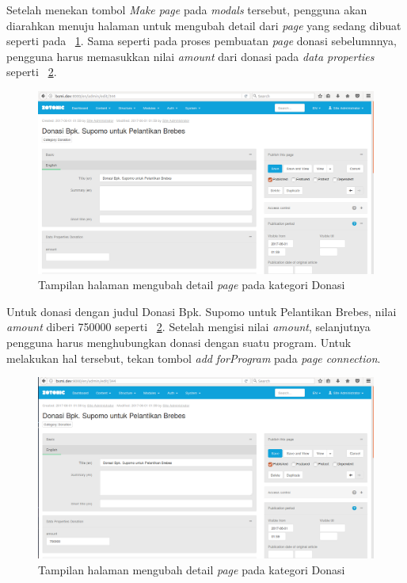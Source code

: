 Setelah menekan tombol \textit{Make page} pada \textit{modals} tersebut, pengguna akan diarahkan menuju halaman untuk mengubah detail dari \textit{page} yang sedang dibuat seperti pada \pic~\ref{fig:edit2donation}. Sama seperti pada proses pembuatan \textit{page} donasi sebelumnnya, pengguna harus memasukkan nilai \textit{amount} dari donasi pada \textit{data properties} seperti \pic~\ref{fig:edit2donation2}.
\begin{figure}
	\centering
	\includegraphics[width=1\textwidth]
	{pics/14-edit2Donation.png}
	\caption{Tampilan halaman mengubah detail \textit{page} pada kategori Donasi}
	\label{fig:edit2donation}
\end{figure}
\vspace{-0.3cm}

Untuk donasi dengan judul Donasi Bpk. Supomo untuk Pelantikan Brebes, nilai \textit{amount} diberi 750000 seperti \pic~\ref{fig:edit2donation2}. Setelah mengisi nilai \textit{amount}, selanjutnya pengguna harus menghubungkan donasi dengan suatu program. Untuk melakukan hal tersebut, tekan tombol \textit{add} \textit{forProgram} pada \textit{page connection}.
\begin{figure}
	\centering
	\includegraphics[width=1\textwidth]
	{pics/15-edit2Donation2.png}
	\caption{Tampilan halaman mengubah detail \textit{page} pada kategori Donasi}
	\label{fig:edit2donation2}
\end{figure}
\vspace{-0.3cm}

